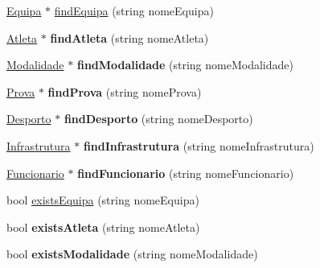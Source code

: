 \begin{DoxyCompactItemize}
\item 
\hyperlink{class_equipa}{Equipa} $\ast$ \hyperlink{class_campeonato_a9cf172b084b661b4647f5010bddbcf34}{find\+Equipa} (string nome\+Equipa)
\item 
\hypertarget{class_campeonato_acde244f2b5f9124ef2842cb22f5dbc34}{}\hyperlink{class_atleta}{Atleta} $\ast$ {\bfseries find\+Atleta} (string nome\+Atleta)\label{class_campeonato_acde244f2b5f9124ef2842cb22f5dbc34}

\item 
\hypertarget{class_campeonato_a22d4d52592cbd305c2d7175f9402653b}{}\hyperlink{class_modalidade}{Modalidade} $\ast$ {\bfseries find\+Modalidade} (string nome\+Modalidade)\label{class_campeonato_a22d4d52592cbd305c2d7175f9402653b}

\item 
\hypertarget{class_campeonato_a0c7c6ba0950d1736a099bbc664df30c5}{}\hyperlink{class_prova}{Prova} $\ast$ {\bfseries find\+Prova} (string nome\+Prova)\label{class_campeonato_a0c7c6ba0950d1736a099bbc664df30c5}

\item 
\hypertarget{class_campeonato_af1301542ce4f7b1b77b52d0f69245031}{}\hyperlink{class_desporto}{Desporto} $\ast$ {\bfseries find\+Desporto} (string nome\+Desporto)\label{class_campeonato_af1301542ce4f7b1b77b52d0f69245031}

\item 
\hypertarget{class_campeonato_aff5ca14d9c636fbef9edd2db4ef8b371}{}\hyperlink{class_infrastrutura}{Infrastrutura} $\ast$ {\bfseries find\+Infrastrutura} (string nome\+Infrastrutura)\label{class_campeonato_aff5ca14d9c636fbef9edd2db4ef8b371}

\item 
\hypertarget{class_campeonato_a09706c3103fcb233036abce01a8b96c9}{}\hyperlink{class_funcionario}{Funcionario} $\ast$ {\bfseries find\+Funcionario} (string nome\+Funcionario)\label{class_campeonato_a09706c3103fcb233036abce01a8b96c9}

\item 
bool \hyperlink{class_campeonato_a7370b81eecbdb3c7fca8ca9400c039a9}{exists\+Equipa} (string nome\+Equipa)
\item 
\hypertarget{class_campeonato_a47f537905c392c2a0c58154164596ff3}{}bool {\bfseries exists\+Atleta} (string nome\+Atleta)\label{class_campeonato_a47f537905c392c2a0c58154164596ff3}

\item 
\hypertarget{class_campeonato_a4f97f51e378298db960324ecd323e0f4}{}bool {\bfseries exists\+Modalidade} (string nome\+Modalidade)\label{class_campeonato_a4f97f51e378298db960324ecd323e0f4}


\end{DoxyCompactItemize}
